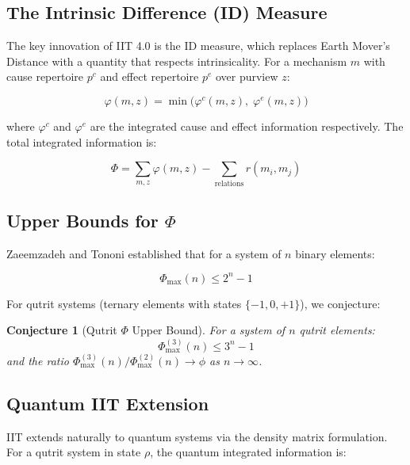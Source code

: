 \documentclass[12pt,a4paper]{article}
\newtheorem{conjecture}[theorem]{Conjecture}
\begin{document}
\subsection{The Intrinsic Difference (ID) Measure}

The key innovation of IIT 4.0 is the ID measure, which replaces Earth Mover's
Distance with a quantity that respects intrinsicality. For a mechanism $m$
with cause repertoire $p^c$ and effect repertoire $p^e$ over purview $z$:

\begin{equation}
\varphi(m, z) = \min\bigl(\varphi^c(m, z),\; \varphi^e(m, z)\bigr)
\end{equation}

\noindent
where $\varphi^c$ and $\varphi^e$ are the integrated cause and effect
information respectively. The total integrated information is:

\begin{equation}
\Phi = \sum_{m,z} \varphi(m, z) - \sum_{\text{relations}} r(m_i, m_j)
\end{equation}

\subsection{Upper Bounds for $\Phi$}

Zaeemzadeh and Tononi \cite{Zaeemzadeh2024} established that for a system of
$n$ binary elements:

\begin{equation}
\Phi_{\max}(n) \leq 2^n - 1
\end{equation}

\noindent
For qutrit systems (ternary elements with states $\{-1, 0, +1\}$), we
conjecture:

\begin{conjecture}[Qutrit $\Phi$ Upper Bound]
For a system of $n$ qutrit elements:
\begin{equation}
\Phi_{\max}^{(3)}(n) \leq 3^n - 1
\end{equation}
and the ratio $\Phi_{\max}^{(3)}(n) / \Phi_{\max}^{(2)}(n) \to \phi$ as
$n \to \infty$.
\end{conjecture}

\subsection{Quantum IIT Extension}

IIT extends naturally to quantum systems via the density matrix formulation. For
a qutrit system in state $\rho$, the quantum integrated information is:
\end{document}
